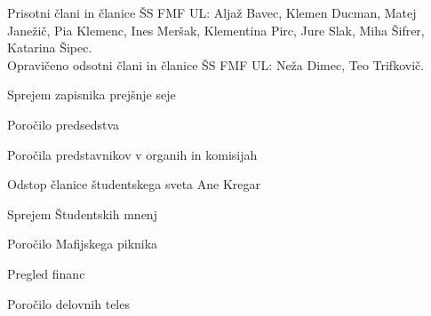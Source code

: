\documentclass{seja}
\begin{document}
Prisotni člani in članice ŠS FMF UL:
Aljaž Bavec,
Klemen Ducman,
Matej Janežič,
Pia Klemenc,
Ines Meršak,
Klementina Pirc,
Jure Slak,
Miha Šifrer,
Katarina Šipec.
\\
Opravičeno odsotni člani in članice ŠS FMF UL:
Neža Dimec, Teo Trifkovič.


\begin{red*}
  \item Sprejem zapisnika prejšnje seje
  \item Poročilo predsedstva
  \item Poročila predstavnikov v organih in komisijah
  \item Odstop članice študentskega sveta Ane Kregar
  \item Sprejem Študentskih mnenj
  \item Poročilo Mafijskega piknika
  \item Pregled financ
  \item Poročilo delovnih teles
\end{red*}
\end{document}
